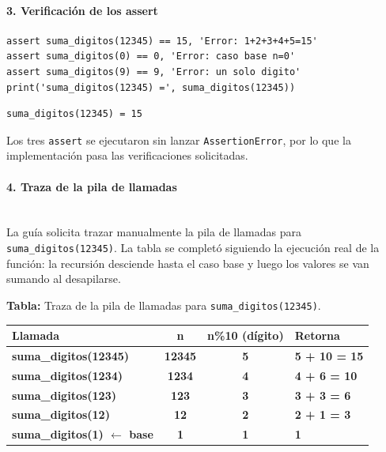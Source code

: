 \documentclass[12pt,a4paper]{article}
\begin{document}
\paragraph{3. Verificación de los assert}\mbox{}

\begin{lstlisting}[style=python,caption={Verificaciones exigidas por la guía.}]
assert suma_digitos(12345) == 15, 'Error: 1+2+3+4+5=15'
assert suma_digitos(0) == 0, 'Error: caso base n=0'
assert suma_digitos(9) == 9, 'Error: un solo digito'
print('suma_digitos(12345) =', suma_digitos(12345))
\end{lstlisting}

\begin{lstlisting}[style=consola,caption={Salida de consola.}]
suma_digitos(12345) = 15
\end{lstlisting}

Los tres \texttt{assert} se ejecutaron sin lanzar \texttt{AssertionError}, por lo que la
implementación pasa las verificaciones solicitadas.

\paragraph{4. Traza de la pila de llamadas}\mbox{}\\[4pt]

La guía solicita trazar manualmente la pila de llamadas para \texttt{suma\_digitos(12345)}.
La tabla se completó siguiendo la ejecución real de la función: la recursión desciende
hasta el caso base y luego los valores se van sumando al desapilarse.

\begin{center}
\textbf{Tabla:} Traza de la pila de llamadas para \texttt{suma\_digitos(12345)}.

\vspace{4pt}
\begin{tabular}{|l|c|c|l|}
\hline
\textbf{Llamada} & \textbf{n} & \textbf{n\%10 (dígito)} & \textbf{Retorna} \\
\hline
\textbf{suma\_digitos(12345)} & \textbf{12345} & \textbf{5} & \textbf{5 + 10 = 15} \\
\hline
\textbf{suma\_digitos(1234)} & \textbf{1234} & \textbf{4} & \textbf{4 + 6 = 10} \\
\hline
\textbf{suma\_digitos(123)} & \textbf{123} & \textbf{3} & \textbf{3 + 3 = 6} \\
\hline
\textbf{suma\_digitos(12)} & \textbf{12} & \textbf{2} & \textbf{2 + 1 = 3} \\
\hline
\textbf{suma\_digitos(1) $\leftarrow$ base} & \textbf{1} & \textbf{1} & \textbf{1} \\
\hline
\end{tabular}
\end{center}
\end{document}

